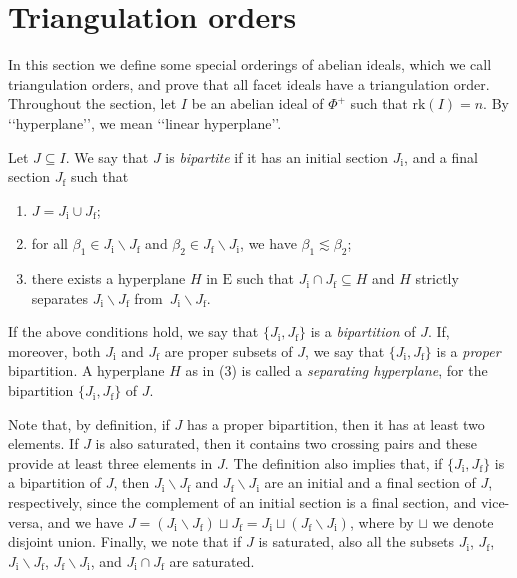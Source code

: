 \documentclass[ALCO,published]{cedram}
\theoremstyle{plain}
\newcommand\smeno{\smallsetminus}
\newcommand\rk{\mathrm{rk}}
\newcommand\be{\beta}
\begin{document}
\section{Triangulation orders}\label{sec:triang-order} 

In this section we define some special orderings of abelian ideals, which we call triangulation orders, and prove that all facet ideals have a triangulation order.
Throughout the section, let $I$ be an abelian ideal of $\Phi^+$ such that $\rk(I)=n$.
By \lq\lq hyperplane\rq\rq, we mean  \lq\lq linear hyperplane\rq\rq.

\pagebreak


\begin{defi}\label{def:bipartite}
Let $J \subseteq I$.
We say that $J$ is {\it bipartite} if it has an initial section  $J_{\mathrm i}$, and a final section $J_{\mathrm f}$ such that 
\begin{enumerate}
\item $J=J_{\mathrm i}\cup J_{\mathrm f}$; 
\item for all $\be_1\in J_{\mathrm i}\smeno J_{\mathrm f}$  and $\be_2\in J_{\mathrm f}\smeno J_{\mathrm i}$, we have  $\be_1\lesssim \be_2$;
\item there exists a hyperplane $H$ in $\mathrm E$ such that $J_{\mathrm i}\cap J_{\mathrm f}\subseteq H$ and $H$ strictly separates  $J_{\mathrm i}\smeno J_{\mathrm f}$  from~$J_{\mathrm i}\smeno J_{\mathrm f}$.
\end{enumerate}
If the above conditions hold, we say that $\{J_{\mathrm i},J_{\mathrm f}\}$ is a  {\it bipartition} of $J$.
If, moreover, both $J_{\mathrm i}$ and  $J_{\mathrm f}$ are proper subsets of $J$, we say that $\{J_{\mathrm i},J_{\mathrm f}\}$ is a {\it proper} bipartition.  
A hyperplane $H$ as in (3) is called a {\it separating hyperplane}, for the bipartition  $\{J_{\mathrm i},J_{\mathrm f}\}$ of $J$.
\end{defi}

Note that, by definition, if $J$ has a proper bipartition, then  it has at least two elements. 
If $J$ is also saturated, then it contains two crossing pairs and these provide at least three elements in $J$.
The definition also implies that, if  $\{J_{\mathrm i}, J_{\mathrm f}\}$ is a  bipartition of $J$, then $J_{\mathrm i}\smeno J_{\mathrm f}$ and $J_{\mathrm f}\smeno J_{\mathrm i}$ are an initial and a final section of $J$, respectively, 
since the complement of an initial section is a final section, and vice-versa, and we have $J=(J_{\mathrm i}\smeno J_{\mathrm f})\sqcup J_{\mathrm f}=J_{\mathrm i}\sqcup (J_{\mathrm f}\smeno J_{\mathrm i})$, where by $\sqcup$ we denote disjoint union. 
Finally, we note that if $J$ is saturated, also all the subsets $J_{\mathrm i}$, $J_{\mathrm f}$,  $J_{\mathrm i}\smeno J_{\mathrm f}$, $J_{\mathrm f}\smeno J_{\mathrm i}$, and $J_{\mathrm i}\cap  J_{\mathrm f}$ are saturated. 
\end{document}
